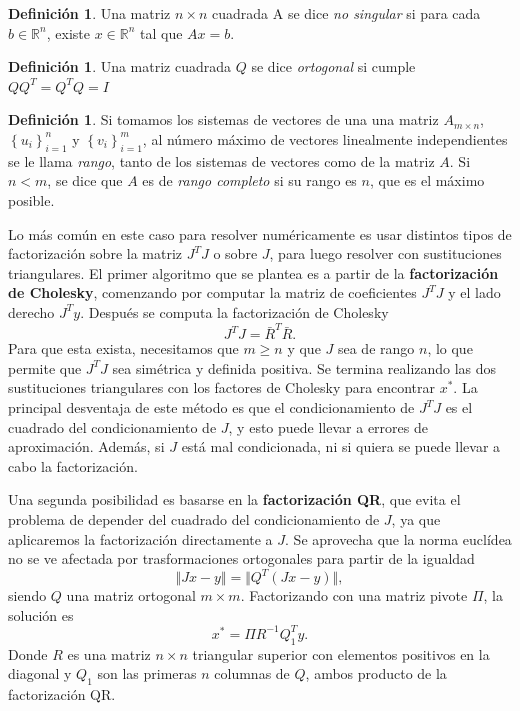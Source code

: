 \documentclass[11pt,a4paper]{book}
\theoremstyle{definition}
\newtheorem{definition}[theorem]{Definición}
\theoremstyle{remark}
\newcommand{\sucesion}[1]{\left\{#1\right\}}
\begin{document}
\begin{definition}
	Una matriz $n \times n$ cuadrada A se dice \textit{no singular} si para cada $b \in \mathbb{R}^n$, existe $x\in\mathbb{R}^n$ tal que $Ax=b$.
\end{definition}

\begin{definition}
	Una matriz cuadrada $Q$ se dice \textit{ortogonal} si cumple $QQ^T=Q^TQ=I$
\end{definition}

\begin{definition}
	Si tomamos los sistemas de vectores de una una matriz $A_{m \times n}$, $\sucesion{u_i}_{i=1}^n$ y $\sucesion{v_i}_{i=1}^m$, al número máximo de vectores linealmente independientes se le llama \textit{rango}, tanto de los sistemas de vectores como de la matriz $A$. Si $n<m$, se dice que $A$ es de \textit{rango completo} si su rango es $n$, que es el máximo posible.
\end{definition}

Lo más común en este caso para resolver numéricamente es usar distintos tipos de factorización sobre la matriz $J^TJ$ o sobre $J$, para luego resolver con sustituciones triangulares.
El primer algoritmo que se plantea es a partir de la \textbf{factorización de Cholesky}, comenzando por computar la matriz de coeficientes $J^TJ$ y el lado derecho $J^Ty$. Después se computa la factorización de Cholesky
\begin{equation}
	J^TJ = \bar R^T\bar R.
\end{equation}
Para que esta exista, necesitamos que $m \geq n$ y que $J$ sea de rango $n$,
lo que permite que $J^TJ$ sea simétrica y definida positiva.
Se termina realizando las dos sustituciones triangulares con los factores de Cholesky para encontrar $x^*$.
La principal desventaja de este método es que el condicionamiento de $J^TJ$ es el cuadrado del condicionamiento de $J$, y esto puede llevar a errores de aproximación.
Además, si $J$ está mal condicionada, ni si quiera se puede llevar a cabo la factorización.

Una segunda posibilidad es basarse en la \textbf{factorización QR}, que evita el problema de depender del cuadrado del condicionamiento de $J$, ya que aplicaremos la factorización directamente a $J$. Se aprovecha que la norma euclídea no se ve afectada por trasformaciones ortogonales para partir de la igualdad
\begin{equation}
	\Vert Jx- y \Vert = \Vert Q^T(Jx-y) \Vert, 
\end{equation}
siendo $Q$ una matriz ortogonal $m \times m$. Factorizando con una matriz pivote $\Pi$, la solución es
\begin{equation}
	x^* = \Pi R^{-1}Q_1^Ty.
\end{equation}
Donde $R$ es una matriz $n \times n$ triangular superior con elementos positivos en la diagonal y $Q_1$ son las primeras $n$ columnas de $Q$, ambos producto de la factorización QR.
\end{document}
